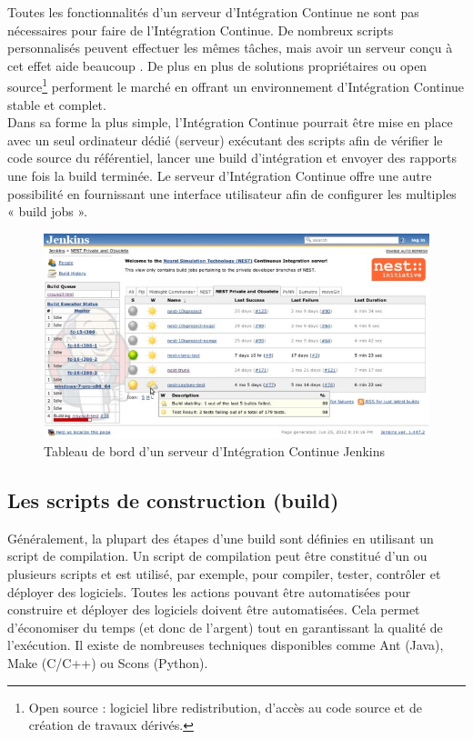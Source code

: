     Toutes les fonctionnalités d’un serveur d’Intégration Continue ne sont pas nécessaires pour faire de l’Intégration Continue. De nombreux scripts personnalisés peuvent effectuer les mêmes tâches, mais avoir un serveur conçu à cet effet aide beaucoup \cite{Duv07}. De plus en plus de solutions propriétaires ou \gls{open source}\footnote{Open source : logiciel libre redistribution, d'accès au code source et de création de travaux dérivés.} performent le marché en offrant un environnement d’Intégration Continue stable et complet.\\

    Dans sa forme la plus simple, l’Intégration Continue pourrait être mise en place avec un seul ordinateur dédié (serveur) exécutant des scripts afin de vérifier le code source du référentiel, lancer une build d’intégration et envoyer des rapports une fois la build terminée. Le serveur d’Intégration Continue offre une autre possibilité en fournissant une interface utilisateur afin de configurer les multiples « build jobs ».

    \begin{figure}
      \begin{center}
        \includegraphics[scale=0.5]{images/jenkinsBuildJobs.png}
      \end{center}
      \caption{Tableau de bord d'un serveur d'Intégration Continue Jenkins}
      \label{Jenkins build jobs}
    \end{figure}

    \subsection{Les scripts de construction (build)}
    Généralement, la plupart des étapes d’une build sont définies en utilisant un script de compilation. Un script de compilation peut être constitué d'un ou plusieurs scripts et est utilisé, par exemple, pour compiler, tester, contrôler et déployer des logiciels. Toutes les actions pouvant être automatisées pour construire et déployer des logiciels doivent être automatisées. Cela permet d'économiser du temps (et donc de l'argent) tout en garantissant la qualité de l'exécution. Il existe de nombreuses techniques disponibles comme Ant (Java), Make (C/C++) ou Scons (Python).\\

